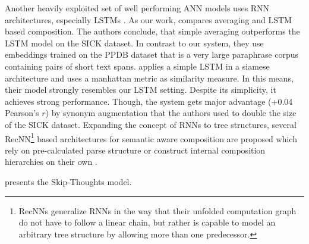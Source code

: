 Another heavily exploited set of well performing \ac{ANN} models uses \ac{RNN} architectures, especially \acfp{LSTM} \autocite{wieting_towards_2015,liu_multi-timescale_2015,mueller_siamese_2016}. As our work, \textcite{wieting_towards_2015} compares averaging and \ac{LSTM} based composition. The authors conclude, that simple averaging outperforms the \ac{LSTM} model on the SICK dataset. In contrast to our system, they use embeddings trained on the PPDB \autocite{ganitkevitch_ppdb_2013} dataset that is a very large paraphrase corpus containing pairs of short text spans. \textcite{mueller_siamese_2016} applies a simple \ac{LSTM} in a siamese architecture and uses a manhattan metric as similarity measure. In this means, their model strongly resembles our \ac{LSTM} setting. Despite its simplicity, it achieves strong performance. Though, the system gets major advantage ($+0.04$ Pearson's $r$) by synonym augmentation that the authors used to double the size of the SICK dataset. Expanding the concept of \acp{RNN} to tree structures, several \acf{RecNN}\footnote{\acp{RecNN} generalize \acp{RNN} in the way that their unfolded computation graph do not have to follow a linear chain, but rather is capable to model an arbitrary tree structure by allowing more than one predecessor.} \autocite{goller_learning_1996} based architectures for semantic aware composition are proposed which rely on pre-calculated parse structure \autocite{socher_dynamic_2011,socher_semantic_2012,socher_recursive_2013,irsoy_deep_2014,tai_improved_2015,wieting_paraphrase_2015} or construct internal composition hierarchies on their own \autocite{zhao_self-adaptive_2015,chen_sentence_2015}.

\textcite{kiros_skip-thought_2015} presents the Skip-Thoughts model. 






